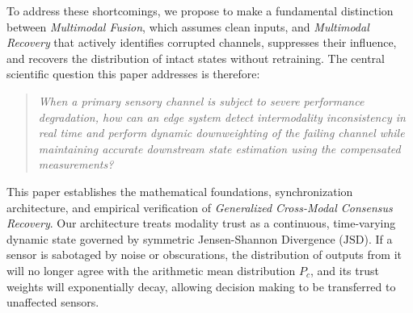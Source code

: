 \documentclass[conference]{IEEEtran}
\begin{document}
To address these shortcomings, we propose to make a fundamental distinction between \textit{Multimodal Fusion}, which assumes clean inputs, and \textit{Multimodal Recovery} that actively identifies corrupted channels, suppresses their influence, and recovers the distribution of intact states without retraining. The central scientific question this paper addresses is therefore:
\begin{quote}
\textit{When a primary sensory channel is subject to severe performance degradation, how can an edge system detect intermodality inconsistency in real time and perform dynamic downweighting of the failing channel while maintaining accurate downstream state estimation using the compensated measurements?}
\end{quote}

This paper establishes the mathematical foundations, synchronization architecture, and empirical verification of \textit{Generalized Cross-Modal Consensus Recovery}. Our architecture treats modality trust as a continuous, time-varying dynamic state governed by symmetric Jensen-Shannon Divergence ($\mathrm{JSD}$). If a sensor is sabotaged by noise or obscurations, the distribution of outputs from it will no longer agree with the arithmetic mean distribution $P_c$, and its trust weights will exponentially decay, allowing decision making to be transferred to unaffected sensors.
\end{document}
